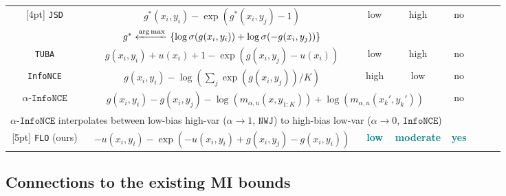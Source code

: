 \documentclass{article}
\theoremstyle{plain}
\theoremstyle{definition}
\theoremstyle{remark}
\newcommand{\infonce}{\texttt{InfoNCE}}
\newcommand{\NWJ}{\texttt{NWJ}}
\newcommand{\ANCE}{\texttt{$\alpha$-InfoNCE}}
\begin{document}
\begin{table}[t!]
\begin{center}
{\begin{tabular}{cccccccc}
						[4pt]
						\texttt{JSD} \citep{hjelm2019learning} & $g^*(x_i, y_i) - \exp(g^*(x_i, y_j)-1)$ & low & high & no \\
						[4pt]
						& $g^* \xleftarrow{\operatorname{\arg\max}} \{ \log \sigma(g(x_i, y_i)) + \log \sigma(-g(x_i ,y_j)) \}$  \\
						[4pt]
						\texttt{TUBA} \citep{poole2019variational} & $g(x_i, y_i)+u(x_i)+1 - \exp(g(x_i ,y_j)-u(x_i))$ & low & high & no \\
						[4pt]
						\texttt{InfoNCE} \citep{oord2018representation} & $g(x_i,y_i) - \log(\sum_j \exp(g(x_i, y_j))/K)$ & high & low & no\\
						[4pt]
						$\ANCE$ \citep{poole2019variational} & \multicolumn{3}{c}{$g(x_i, y_i) - g(x_i, y_j) - \log (m_{\alpha, u}(x,  y_{1:K}))+\log (m_{\alpha, u}(x_k', y_k'))$} & no \\
						[2pt]
						\multicolumn{4}{c}{$\ANCE$ interpolates between low-bias high-var ($\alpha\rightarrow 1$, $\NWJ$) to high-bias low-var ($\alpha\rightarrow 0$, $\infonce$)} \\
						[5pt]
						\texttt{FLO} (ours) & $-u(x_i ,y_i) - \exp(-u(x_i, y_i)+g(x_i, y_j)-g(x_i, y_i))$ & {\bf \textcolor{teal}{low}} & {\bf \textcolor{teal}{moderate}} & {\bf \textcolor{teal}{yes}}\\
						\bottomrule
					\end{tabular}
				}
				\vspace{-1.5em}
			\end{center}
		\end{table}
		
		
		
		\vspace{-5pt}
		\subsection{Connections to the existing MI bounds} 
		\vspace{-5pt}
		
\end{document}
